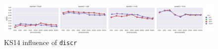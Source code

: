 \begin{figure}[b]
  \centering

  \includegraphics[width=1.1\textwidth]{supplement/figures/KS14-interaction-discr}

  \caption{KS14 influence of \texttt{discr}}
  \label{fig:ks14-discr}
\end{figure}
